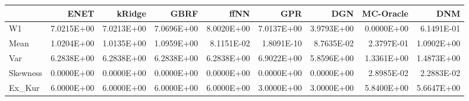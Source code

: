 \begin{tabular}{lrrrrrrrr}
\toprule
{} &       ENET &     kRidge &       GBRF &       ffNN &        GPR &        DGN &  MC-Oracle &        DNM \\
\midrule
W1       & 7.0215E+00 & 7.0213E+00 & 7.0696E+00 & 8.0020E+00 & 7.0137E+00 & 3.9793E+00 & 0.0000E+00 & 6.1491E-01 \\
Mean     & 1.0204E+00 & 1.0135E+00 & 1.0959E+00 & 8.1151E-02 & 1.8091E-10 & 8.7635E-02 & 2.3797E-01 & 1.0902E+00 \\
Var      & 6.2838E+00 & 6.2838E+00 & 6.2838E+00 & 6.2838E+00 & 6.9022E+00 & 5.8596E+00 & 1.3361E+00 & 1.4873E+00 \\
Skewness & 0.0000E+00 & 0.0000E+00 & 0.0000E+00 & 0.0000E+00 & 0.0000E+00 & 0.0000E+00 & 2.8985E-02 & 2.2883E-02 \\
Ex\_Kur   & 6.0000E+00 & 6.0000E+00 & 6.0000E+00 & 6.0000E+00 & 3.0000E+00 & 3.0000E+00 & 5.8400E+00 & 5.6647E+00 \\
\bottomrule
\end{tabular}

